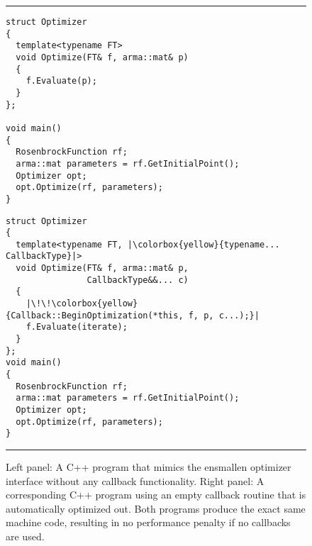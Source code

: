 \begin{figure}[t!]
\centering
\hrule
\vspace{1ex}
\begin{minipage}{0.47\textwidth}
\begin{verbatim}
struct Optimizer
{
  template<typename FT>
  void Optimize(FT& f, arma::mat& p)
  {
    f.Evaluate(p);
  }
};

void main()
{
  RosenbrockFunction rf;
  arma::mat parameters = rf.GetInitialPoint();
  Optimizer opt;
  opt.Optimize(rf, parameters);
}

\end{verbatim}
\end{minipage}
%
\hfill
\vline
\hfill
%
\begin{minipage}{0.51\textwidth}
\begin{verbatim}
struct Optimizer
{
  template<typename FT, |\colorbox{yellow}{typename... CallbackType}|>
  void Optimize(FT& f, arma::mat& p,
                CallbackType&&... c)
  {
    |\!\!\colorbox{yellow}{Callback::BeginOptimization(*this, f, p, c...);}|
    f.Evaluate(iterate);
  }
};
void main()
{
  RosenbrockFunction rf;
  arma::mat parameters = rf.GetInitialPoint();
  Optimizer opt;
  opt.Optimize(rf, parameters);
}
\end{verbatim}
\end{minipage}
\vspace{1ex}
\hrule
\caption
  {
  Left panel: A C++ program that mimics the ensmallen optimizer interface
  without any callback functionality. Right panel: A corresponding C++ program
  using an empty callback routine that is automatically optimized out. Both
  programs produce the exact same machine code, resulting in no performance
  penalty if no callbacks are used.
  }
\label{fig:callback_compilter_opt}
\end{figure}
